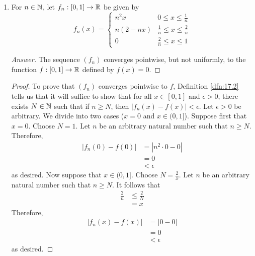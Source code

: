 \documentclass[../main.tex]{subfiles}
\begin{document}
\begin{exercise}
\begin{enumerate}[label={(\alph*)}]
\begin{proof}
\begin{align*}
                &< \epsilon
            \end{align*}
            as desired.
        \end{proof}
        \item For $n\in\mathbb{N}$, let $f_n:[0,1]\to\mathbb{R}$ be given by
        \begin{equation*}
            f_n(x) =
            \begin{cases}
                n^2x & 0\leq x\leq\frac{1}{n}\\
                n(2-nx) & \frac{1}{n}\leq x\leq\frac{2}{n}\\
                0 & \frac{2}{n}\leq x\leq 1
            \end{cases}
        \end{equation*}
        \begin{proof}[Answer]
            The sequence $(f_n)$ converges pointwise, but not uniformly, to the function $f:[0,1]\to\mathbb{R}$ defined by $f(x)=0$.
        \end{proof}
        \begin{proof}
            To prove that $(f_n)$ converges pointwise to $f$, Definition \ref{dfn:17.2} tells us that it will suffice to show that for all $x\in[0,1]$ and $\epsilon>0$, there exists $N\in\mathbb{N}$ such that if $n\geq N$, then $|f_n(x)-f(x)|<\epsilon$. Let $\epsilon>0$ be arbitrary. We divide into two cases ($x=0$ and $x\in(0,1]$). Suppose first that $x=0$. Choose $N=1$. Let $n$ be an arbitrary natural number such that $n\geq N$. Therefore,
            \begin{align*}
                |f_n(0)-f(0)| &= |n^2\cdot 0-0|\\
                &= 0\\
                &< \epsilon
            \end{align*}
            as desired. Now suppose that $x\in(0,1]$. Choose $N=\frac{2}{x}$. Let $n$ be an arbitrary natural number such that $n\geq N$. It follows that
            \begin{align*}
                \frac{2}{n} &\leq \frac{2}{N}\\
                &= x
            \end{align*}
            Therefore,
            \begin{align*}
                |f_n(x)-f(x)| &= |0-0|\\
                &= 0\\
                &< \epsilon
            \end{align*}
            as desired.\par

\end{proof}
\end{enumerate}
\end{exercise}
\end{document}
